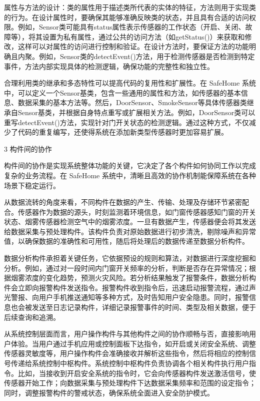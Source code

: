 属性与方法的设计：类的属性用于描述类所代表的实体的特征，方法则用于实现类的行为。在设计属性时，要确保其能够准确反映类的状态，并且具有合适的访问权限。例如，Sensor类可能具有status属性表示传感器的工作状态（开启、关闭、故障等），将其设置为私有属性，通过公共的访问方法（如getStatus()）来获取和修改，这样可以对属性的访问进行控制和验证。在设计方法时，要保证方法的功能明确且内聚。例如，Sensor类的detectEvent()方法，用于检测传感器是否检测到特定事件，方法内部实现具体的检测逻辑，确保功能的完整性和独立性。

合理利用类的继承和多态特性可以提高代码的复用性和扩展性。在 SafeHome 系统中，可以定义一个Sensor基类，包含一些通用的属性和方法，如传感器的基本信息、数据采集的基本方法等。然后，DoorSensor、SmokeSensor等具体传感器类继承自Sensor基类，并根据自身特点重写或扩展相关方法。例如，DoorSensor类可以重写detectEvent()方法，实现针对门开关状态的检测逻辑。通过这种方式，不仅减少了代码的重复编写，还使得系统在添加新类型传感器时更加容易扩展。

3 构件间的协作

构件间的协作是实现系统整体功能的关键，它决定了各个构件如何协同工作以完成复杂的业务流程。在 SafeHome 系统中，清晰且高效的协作机制能保障系统在各种场景下稳定运行。

从数据流转的角度来看，不同构件在数据的产生、传输、处理及存储环节紧密配合。传感器作为数据的源头，时刻监测着环境信息，如门窗传感器感知门窗的开关状态、烟雾传感器检测空气中的烟雾浓度。一旦有数据产生，传感器便会将其发送给数据采集与预处理构件。该构件负责对原始数据进行初步清洗，剔除噪声和异常值，以确保数据的准确性和可用性，随后将处理后的数据传递至数据分析构件。

数据分析构件承担着关键任务，它依据预设的规则和算法，对数据进行深度挖掘和分析。例如，通过对一段时间内门窗开关频率的分析，判断是否存在异常情况；根据烟雾浓度的变化趋势，预测火灾风险。若分析结果触发了报警条件，数据分析构件会立即向报警构件发送指令。报警构件收到指令后，迅速启动报警流程，通过声光警报、向用户手机推送通知等多种方式，及时告知用户安全隐患。同时，报警信息也会被发送至日志记录构件，详细记录报警事件的时间、类型及相关数据，便于后续查询和追溯。

从系统控制层面而言，用户操作构件与其他构件之间的协作顺畅与否，直接影响用户体验。当用户通过手机应用或控制面板下达指令，如开启或关闭安全系统、调整传感器灵敏度等，用户操作构件会准确接收并解析这些指令，然后将相应的控制信号传递给系统控制中枢构件。系统控制中枢构件负责协调各个相关构件执行用户指令。比如，当接收到开启安全系统的指令时，它会向传感器构件发送激活信号，使传感器开始工作；向数据采集与预处理构件下达数据采集频率和范围的设定指令；同时，调整报警构件的警戒状态，确保系统全面进入安全防护模式。

